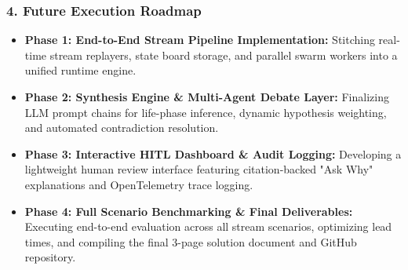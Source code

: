 \documentclass[10pt,a4paper]{article}
\begin{document}
\subsubsection*{\color{primary} 4. Future Execution Roadmap}
\begin{itemize}
    \item \textbf{Phase 1: End-to-End Stream Pipeline Implementation:} Stitching real-time stream replayers, state board storage, and parallel swarm workers into a unified runtime engine.
    \item \textbf{Phase 2: Synthesis Engine \& Multi-Agent Debate Layer:} Finalizing LLM prompt chains for life-phase inference, dynamic hypothesis weighting, and automated contradiction resolution.
    \item \textbf{Phase 3: Interactive HITL Dashboard \& Audit Logging:} Developing a lightweight human review interface featuring citation-backed "Ask Why" explanations and OpenTelemetry trace logging.
    \item \textbf{Phase 4: Full Scenario Benchmarking \& Final Deliverables:} Executing end-to-end evaluation across all stream scenarios, optimizing lead times, and compiling the final 3-page solution document and GitHub repository.
\end{itemize}
\end{document}
